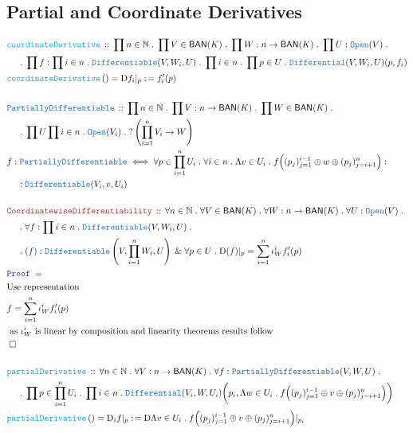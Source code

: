 \documentclass[12pt]{scrartcl}
\newcommand{\TYPE}[1]{\textcolor{NavyBlue}{\mathtt{#1}}}
\newcommand{\FUNC}[1]{\textcolor{Cerulean}{\mathtt{#1}}}
\newcommand{\LOGIC}[1]{\textcolor{Blue}{\mathtt{#1}}}
\newcommand{\THM}[1]{\textcolor{Maroon}{\mathtt{#1}}}
\renewcommand{\.}{\; . \;}
\newcommand{\de}{: \kern 0.1pc =}
\newcommand{\Act}[1]{\left( #1 \right)}
\newcommand{\Theorem}[2]{& \THM{#1} \, :: \, #2 \\ & \Proof = \\ }
\newcommand{\DeclareType}[2]{& \TYPE{#1} \, :: \, #2 \\}
\newcommand{\DefineType}[3]{& #1 : \TYPE{#2} \iff #3 \\}
\newcommand{\DeclareFunc}[2]{& \FUNC{#1} \, :: \, #2 \\}
\newcommand{\DefineNamedFunc}[4]{&  \FUNC{#1}\Act{#2} = #3 \de #4 \\}
\newcommand{\NewLine}{\\ & \kern 1pc}
\newcommand{\Page}[1]{\begin{align*} #1 \end{align*}   }
\renewcommand{\And}{\; \& \;}
\newcommand{\Nat}{\mathbb{N} }
\newcommand{\QED}{\; \square}
\newcommand{\EndProof}{& \QED \\}
\newcommand{\Proof}{\LOGIC{Proof} \; }
\newcommand{\BAN}{\mathsf{BAN}} %
\newcommand{\D}{\mathrm{D}}
\begin{document}
\subsection{Partial and Coordinate Derivatives}
\Page{
	\DeclareFunc{coordinateDerivative}{\prod n \in \Nat \. \prod V \in \BAN(K) \. \prod W : n \to \BAN(K) \. \prod U : \TYPE{Open}(V) \.
	\NewLine \.
	\prod f : \prod i \in n \. \TYPE{Differentiable}(V,W_i,U) \. \prod i \in n \. \prod p \in U \. \TYPE{Differential}(V,W_i,U)(p,f_i)
	}
	\DefineNamedFunc{coordinateDerivative}{ }{ \D f_i |_p }{f'_i(p)}
	\\
	\DeclareType{PartiallyDifferentiable}
	{ \prod n \in \Nat \. \prod V : n \to \BAN(K) \. \prod W \in \BAN(K) \. 
	\NewLine \.
	\prod U
	\prod i \in n \. \TYPE{Open}(V_i)  \. ?\left( \prod^n_{i = 1} V_i \to W \right)  }
	\DefineType{f}{PartiallyDifferentiable}
	{  \forall p \in \prod^n_{i = 1} U_i \. \forall i \in n \.
		\Lambda v \in U_i \. f\Big( (p_j)^{i-1}_{j = 1} \oplus w \oplus (p_j)_{j = i + 1}^n \Big) :
                \NewLine 
		: \TYPE{Differentiable}(V_i,v,U_i)  }
	\\
	\Theorem{CoordinatewiseDifferentiability}
	{
		\forall n \in \Nat \. \forall V \in \BAN(K) \. \forall W : n \to \BAN(K) \.
		\forall U  : \TYPE{Open}(V) \. \NewLine \.
		\forall f : \prod i \in n \. \TYPE{Differentiable}(V,W_i,U) \.  
		\NewLine \.
		(f) : \TYPE{Differentiable}\left(V, \prod^n_{i = 1} W_i, U \right) \And 
		\forall p \in U \. \D (f) |_p = \sum^n_{i = 1} \iota_W^i f'_i(p) 
	}
	& \textrm{Use representation}  \\
	&  f = \sum^n_{i = 1} \iota_W^i f'_i(p)  \\
	& \textrm{ as $\iota_W^i$ is linear by composition and linearity theorems results follow} \\
	\EndProof
	\\
	\DeclareFunc{partialDerivative}{
		\forall n \in \Nat \. \forall V : n \to \BAN(K) \.
		\forall f : \TYPE{PartiallyDifferentiable}(V,W,U)
		\. \NewLine \.
		\prod p \in \prod^n_{i = 1} U_i \. \prod i \in n \.
		\TYPE{Differential}(V_i,W,U_i)\bigg(p_i, \Lambda w \in U_i \. f \Big( (p_j)_{j = 1}^{i -1} \oplus v \oplus (p_j)_{j = i + 1}^n  \Big) \bigg)
	}
	\DefineNamedFunc{partialDerivative}{}{ \D_i f |_p }{ \D \Lambda v \in U_i \. f \Big( (p_j)_{j = 1}^{i -1} \oplus v \oplus (p_j)_{j = i + 1}^n  \Big) |_{p_i} } 
}
\end{document}
